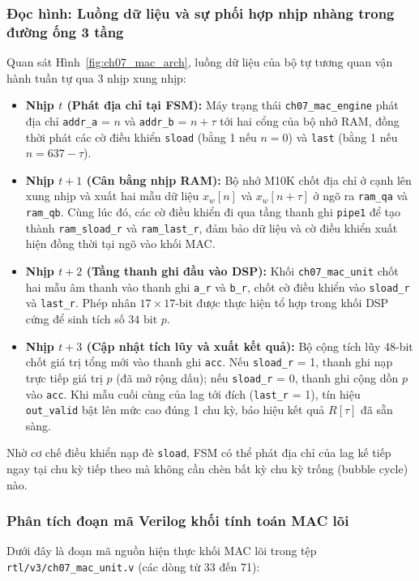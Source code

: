 \subsubsection*{Đọc hình: Luồng dữ liệu và sự phối hợp nhịp nhàng trong đường ống 3 tầng}
Quan sát Hình~\ref{fig:ch07_mac_arch}, luồng dữ liệu của bộ tự tương quan vận hành tuần tự qua 3 nhịp xung nhịp:
\begin{itemize}[leftmargin=1.5em, itemsep=3pt]
    \item \textbf{Nhịp $t$ (Phát địa chỉ tại FSM):} Máy trạng thái \texttt{ch07\_mac\_engine} phát địa chỉ \texttt{addr\_a} = $n$ và \texttt{addr\_b} = $n+\tau$ tới hai cổng của bộ nhớ RAM, đồng thời phát các cờ điều khiển \texttt{sload} (bằng 1 nếu $n=0$) và \texttt{last} (bằng 1 nếu $n = 637-\tau$).
    \item \textbf{Nhịp $t+1$ (Cân bằng nhịp RAM):} Bộ nhớ M10K chốt địa chỉ ở cạnh lên xung nhịp và xuất hai mẫu dữ liệu $x_w[n]$ và $x_w[n+\tau]$ ở ngõ ra \texttt{ram\_qa} và \texttt{ram\_qb}. Cùng lúc đó, các cờ điều khiển đi qua tầng thanh ghi \texttt{pipe1} để tạo thành \texttt{ram\_sload\_r} và \texttt{ram\_last\_r}, đảm bảo dữ liệu và cờ điều khiển xuất hiện đồng thời tại ngõ vào khối MAC.
    \item \textbf{Nhịp $t+2$ (Tầng thanh ghi đầu vào DSP):} Khối \texttt{ch07\_mac\_unit} chốt hai mẫu âm thanh vào thanh ghi \texttt{a\_r} và \texttt{b\_r}, chốt cờ điều khiển vào \texttt{sload\_r} và \texttt{last\_r}. Phép nhân $17 \times 17\text{-bit}$ được thực hiện tổ hợp trong khối DSP cứng để sinh tích số $34\text{ bit}$ $p$.
    \item \textbf{Nhịp $t+3$ (Cập nhật tích lũy và xuất kết quả):} Bộ cộng tích lũy 48-bit chốt giá trị tổng mới vào thanh ghi \texttt{acc}. Nếu \texttt{sload\_r} = 1, thanh ghi nạp trực tiếp giá trị $p$ (đã mở rộng dấu); nếu \texttt{sload\_r} = 0, thanh ghi cộng dồn $p$ vào \texttt{acc}. Khi mẫu cuối cùng của lag tới đích (\texttt{last\_r} = 1), tín hiệu \texttt{out\_valid} bật lên mức cao đúng 1 chu kỳ, báo hiệu kết quả $R[\tau]$ đã sẵn sàng.
\end{itemize}

Nhờ cơ chế điều khiển nạp đè \texttt{sload}, FSM có thể phát địa chỉ của lag kế tiếp ngay tại chu kỳ tiếp theo mà không cần chèn bất kỳ chu kỳ trống (bubble cycle) nào.

\subsubsection*{Phân tích đoạn mã Verilog khối tính toán MAC lõi}
Dưới đây là đoạn mã nguồn hiện thực khối MAC lõi trong tệp \texttt{rtl/v3/ch07\_mac\_unit.v} (các dòng từ 33 đến 71):

